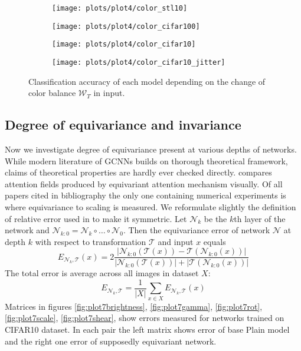    \begin{figure}[h!]
    \begin{adjustwidth}{-11em}{-11em}
        \centering
        \begin{subfigure}{0.6\textwidth}
            \texttt{[image: plots/plot4/color\_stl10]}
        \end{subfigure}
        \begin{subfigure}{0.6\textwidth}
            \texttt{[image: plots/plot4/color\_cifar100]}
        \end{subfigure}
        \begin{subfigure}{0.6\textwidth}
            \texttt{[image: plots/plot4/color\_cifar10]}
        \end{subfigure}
        \begin{subfigure}{0.6\textwidth}
            \texttt{[image: plots/plot4/color\_cifar10\_jitter]}
        \end{subfigure}
    \end{adjustwidth}
        \caption{Classification accuracy of each model depending on the change
        of color balance $\mathcal{W}_T$ in input.}
        \label{fig:plot4color}
    \end{figure}

\clearpage
\subsection{Degree of equivariance and invariance}
    \newcommand{\mcn}{\mathcal{N}}
    \newcommand{\mct}{\mathcal{T}}
    Now we investigate degree of equivariance present at
    various depths of networks. While modern literature of GCNNs builds on
    thorough theoretical framework, claims of theoretical properties are hardly
    ever checked directly. \cite{attentive_gcnn} compares attention fields
    produced by equivariant attention mechanism visually.
    Of all papers cited in bibliography the only one containing numerical
    experiments is
    \cite{scale_steerable} where equivariance to scaling is measured.
    We reformulate slightly the definition of relative error used in
    \cite{scale_steerable} to make it symmetric.
    Let $\mcn_k$ be the $k$th layer of
    the network and $\mcn_{k:0} = \mcn_k \circ \dots \circ \mcn_0$. Then the
    equivariance error of network $\mcn$
    at depth $k$ with respect to transformation $\mathcal{T}$
    and input $x$ equals
    $$ E_{\mcn_k,\mct}(x) = 2\frac{\left|\mcn_{k:0}\left(\mct(x)\right) -
    \mct(\mcn_{k:0}(x))\right|}
    {\left|\mcn_{k:0}(\mct(x))\right| + \left|\mct(\mcn_{k:0}(x))\right|} $$
    The total error is average across all images in dataset $X$:
    $$ E_{\mcn_k,\mct} = \frac{1}{|X|}\sum_{x \in X }E_{\mcn_k,\mct}(x) $$
    Matrices in figures
    \ref{fig:plot7brightness},
    \ref{fig:plot7gamma},
    \ref{fig:plot7rot},
    \ref{fig:plot7scale},
    \ref{fig:plot7shear},
    show errors measured for networks trained on CIFAR10 dataset.
    In each pair the left matrix shows error of base Plain model and the right one
    error of supposedly equivariant network.



